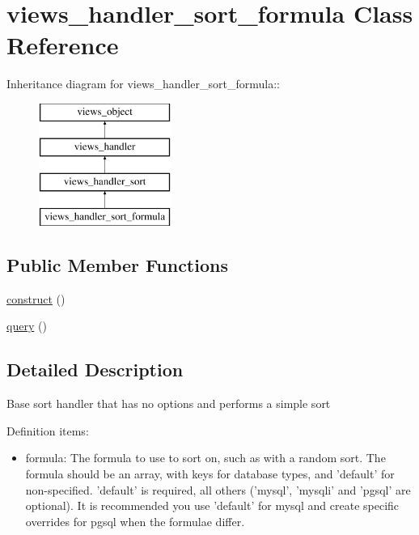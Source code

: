 \hypertarget{classviews__handler__sort__formula}{
\section{views\_\-handler\_\-sort\_\-formula Class Reference}
\label{classviews__handler__sort__formula}
}
Inheritance diagram for views\_\-handler\_\-sort\_\-formula::\begin{figure}[H]
\begin{center}
\leavevmode
\includegraphics[height=4cm]{classviews__handler__sort__formula}
\end{center}
\end{figure}
\subsection*{Public Member Functions}
\begin{CompactItemize}
\item 
\hyperlink{classviews__handler__sort__formula_19d1b335b939c45903815256b5a6e0b8}{construct} ()
\item 
\hyperlink{classviews__handler__sort__formula_208dff453ab94f55000e8027ed3c8588}{query} ()
\end{CompactItemize}


\subsection{Detailed Description}
Base sort handler that has no options and performs a simple sort

Definition items:\begin{itemize}
\item formula: The formula to use to sort on, such as with a random sort. The formula should be an array, with keys for database types, and 'default' for non-specified. 'default' is required, all others ('mysql', 'mysqli' and 'pgsql' are optional). It is recommended you use 'default' for mysql and create specific overrides for pgsql when the formulae differ. \end{itemize}


